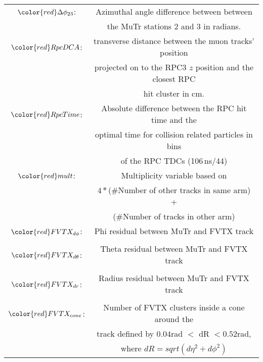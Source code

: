 \begin{table}[hp]
\begin{center}
\begin{tabular}{cc}
${\color{red}\Delta \phi_{23}}$:&Azimuthal angle difference between between\\
& the MuTr stations 2 and 3 in radians.\\
${\color{red}RpcDCA}$:&transverse distance between the muon tracks' position\\
& projected on to the RPC3 $z$ position and the closest RPC\\
& hit cluster in cm.\\
${\color{red}RpcTime}$:&Absolute difference between the RPC hit time and the\\
& optimal time for collision related particles in bins\\
& of the RPC TDCs (106\,ns/44)\\
${\color{red}mult}$:&Multiplicity variable based on\\
& $4*$(\#Number of other tracks in same arm) + \\ &(\#Number of tracks in other arm)\\
${\color{red}FVTX_{d\phi}}$:&Phi residual between MuTr and FVTX track \\
&   \\
${\color{red}FVTX_{d\theta}}$:&Theta  residual between MuTr and FVTX track  \\
&   \\
${\color{red}FVTX_{dr}}$:&Radius  residual between MuTr and FVTX track  \\
&   \\
${\color{red}FVTX_{cone}}$:& Number of FVTX clusters inside a cone around the \\ 
&track defined by $0.04$rad $<$ dR $< 0.52$rad,\\ 
&where $dR = sqrt(d\eta^2 + d\phi^2)$ \\
\end{tabular}
\end{center}
\end{table}
